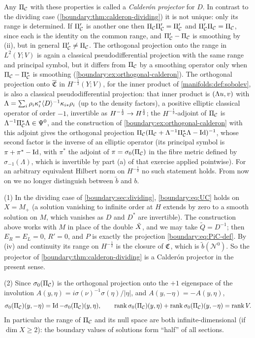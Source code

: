 Any $\Pi_{\mathcal{C}}$ with these properties is called a \emph{Calder\'on projector} for $D$. In
contrast to the dividing case (\cref{boundary:thm:calderon-dividing}) it is not unique:
only its range is determined. If $\Pi_{\mathcal{C}}'$ is another one then $\Pi_{\mathcal{C}}\Pi_{\mathcal{C}}'=\Pi_{\mathcal{C}}'$ and
$\Pi_{\mathcal{C}}'\Pi_{\mathcal{C}}=\Pi_{\mathcal{C}}$, since each is the identity on the common range, and $\Pi_{\mathcal{C}}'-\Pi_{\mathcal{C}}$ is
smoothing by (ii), but in general $\Pi_{\mathcal{C}}'\ne\Pi_{\mathcal{C}}$. The orthogonal projection onto the range in $L^2(Y;V)$ is again a classical
pseudodifferential projection with the same range and principal symbol, but it differs
from $\Pi_{\mathcal{C}}$ by a smoothing operator only when $\Pi_{\mathcal{C}}-\Pi_{\mathcal{C}}^*$ is smoothing
(\cref{boundary:ex:orthogonal-calderon}). The orthogonal projection onto
$\overline{\mathfrak{C}}$ in $H^{-\frac12}(Y;V)$, for the inner product of
\cref{manifolds:def:sobolev}, is also a classical pseudodifferential projection: that
inner product is $( \Lambda u, v)$ with $\Lambda=\sum_i\rho_i\kappa_i^*\langle D\rangle^{-1}
\kappa_{i*}\rho_i$ (up to the density factors), a positive elliptic classical operator of
order $-1$, invertible as $H^{-\frac12}\to H^{\frac12}$; the $H^{-\frac12}$-adjoint of
$\Pi_{\mathcal{C}}$ is $\Lambda^{-1}\Pi_{\mathcal{C}}^*\Lambda\in\Psi^{0}$, and the construction of
\cref{boundary:ex:orthogonal-calderon} with this adjoint gives the orthogonal projection
$\Pi_{\mathcal{C}}(\Pi_{\mathcal{C}}+\Lambda^{-1}\Pi_{\mathcal{C}}^*\Lambda-\operatorname{Id})^{-1}$, whose second factor is the inverse of an
elliptic operator (its principal symbol is $\pi+\pi^{*}-\operatorname{Id}$, with $\pi^*$ the adjoint of
$\pi=\sigma_0(\Pi_{\mathcal{C}})$ in the fibre metric defined by $\sigma_{-1}(\Lambda)$, which is
invertible by part (a) of that exercise applied pointwise). For an arbitrary equivalent
Hilbert norm on $H^{-\frac12}$ no such statement holds. From now on we no
longer distinguish between $\tilde b$ and $b$.

\begin{remark}\label{boundary:rem:calderon-cases}
(1) In the dividing case of \cref{boundary:sec:dividing}, \eqref{boundary:eq:UC} holds on
$X=M_+$ (a solution vanishing to infinite order at $H$ extends by zero to a smooth
solution on $M$, which vanishes as $D$ and $D^*$ are invertible). The construction above
works with $M$ in place of the double $\tilde{X}$, and we may take $\tilde Q=D^{-1}$; then
$E_R=E_L=0$, $R'=0$, and $P$ is exactly the projection \eqref{boundary:eq:PiC-def}. By
(iv) and continuity its range on $H^{-\frac12}$ is the closure of $\mathfrak{C}$, which is
$\tilde b(\mathcal{N}^0)$. So the projector of \cref{boundary:thm:calderon-dividing} is a
Calder\'on projector in the present sense.

(2) Since $\sigma_0(\Pi_{\mathcal{C}})$ is the orthogonal projection onto the $+1$ eigenspace of the
involution $A(y,\eta)=i\sigma(\nu)^{-1}\sigma(\eta)/|\eta|$, and $A(y,-\eta)=-A(y,\eta)$,
\begin{equation*}
\sigma_0(\Pi_{\mathcal{C}})(y,-\eta)=\operatorname{Id}-\sigma_0(\Pi_{\mathcal{C}})(y,\eta),\qquad \operatorname{rank}
\sigma_0(\Pi_{\mathcal{C}})(y,\eta)+\operatorname{rank}\sigma_0(\Pi_{\mathcal{C}})(y,-\eta)=\operatorname{rank}V.
\end{equation*}
In particular the range of $\Pi_{\mathcal{C}}$ and its null space are both infinite-dimensional
(if $\dim X\ge2$): the boundary values of solutions form ``half'' of all sections.
\end{remark}


